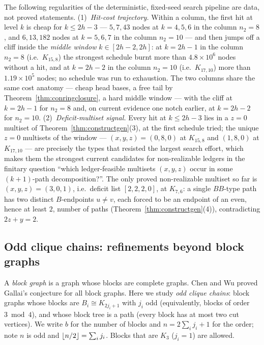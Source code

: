 \begin{observation}
\label{obs:concostwall}
The following regularities of the deterministic, fixed-seed search
pipeline are data, not proved statements.
(1)~\emph{Hit-cost trajectory.} Within a column, the first hit at level
$k$ is cheap for $k\le 2h-3$ --- $5,7,43$ nodes at $k=4,5,6$ in the column
$n_2=8$, and $6,13,182$ nodes at $k=5,6,7$ in the column $n_2=10$ --- and
then jumps off a cliff inside the \emph{middle window} $k\in[2h-2,2h]$: at
$k=2h-1$ in the column $n_2=8$ (i.e.\ $K_{15,8}$) the strongest schedule
burnt more than $4.8\times10^6$ nodes without a hit, and at $k=2h-2$ in
the column $n_2=10$ (i.e.\ $K_{17,10}$) more than $1.19\times10^5$ nodes;
no schedule was run to exhaustion. The two columns share the same cost
anatomy --- cheap head bases, a free tail by
Theorem~\ref{thm:conringclosure}, a hard middle window --- with the cliff
at $k=2h-1$ for $n_2=8$ and, on current evidence one notch earlier, at
$k=2h-2$ for $n_2=10$.
(2)~\emph{Deficit-multiset signal.} Every hit at $k\le 2h-3$ lies in a
$z=0$ multiset of Theorem~\ref{thm:constructgen}(3), at the first schedule
tried; the unique $z=0$ multisets of the window --- $(x,y,z)=(0,8,0)$ at
$K_{15,8}$ and $(1,8,0)$ at $K_{17,10}$ --- are precisely the types that
resisted the largest search effort, which makes them the strongest current
candidates for non-realizable ledgers in the finitary question ``which
ledger-feasible multisets $(x,y,z)$ occur in some $(k+1)$-path
decomposition?''. The only proved non-realizable multiset so far is
$(x,y,z)=(3,0,1)$, i.e.\ deficit list $[2,2,2,0]$, at $K_{7,6}$: a single
$BB$-type path has two distinct $B$-endpoints $u\ne v$, each forced to be
an endpoint of an even, hence at least $2$, number of paths
(Theorem~\ref{thm:constructgen}(4)), contradicting $2z+y=2$.
\end{observation}

\subsection{Odd clique chains: refinements beyond block graphs}
\label{subsec:chains}

A \emph{block graph} is a graph whose blocks are complete graphs. Chen and
Wu \cite{CW25} proved Gallai's conjecture for all block graphs. Here we
study \emph{odd clique chains}: block graphs whose blocks are
$B_i\cong K_{2j_i+1}$ with $j_i$ odd (equivalently, blocks of order
$3 \bmod 4$), and whose block tree is a path (every block has at most two
cut vertices). We write $b$ for the number of blocks and
$n=2\sum_ij_i+1$ for the order; note $n$ is odd and
$\left\lfloor n/2 \right\rfloor=\sum_ij_i$. Blocks that are $K_3$ ($j_i=1$) are allowed.

